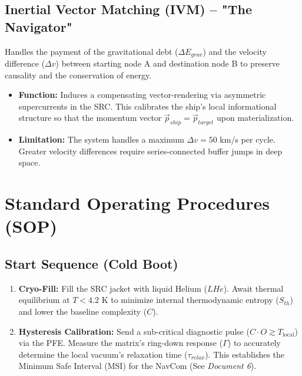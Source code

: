 \documentclass[12pt,a4paper]{article}
\begin{document}
\subsection{Inertial Vector Matching (IVM) -- "The Navigator"}
Handles the payment of the gravitational debt ($\Delta E_{grav}$) and the velocity difference ($\Delta v$) between starting node A and destination node B to preserve causality and the conservation of energy.
\begin{itemize}
    \item \textbf{Function:} Induces a compensating vector-rendering via asymmetric supercurrents in the SRC. This calibrates the ship's local informational structure so that the momentum vector $\vec{p}_{ship} = \vec{p}_{target}$ upon materialization.
    \item \textbf{Limitation:} The system handles a maximum $\Delta v = 50$ km/s per cycle. Greater velocity differences require series-connected buffer jumps in deep space.
\end{itemize}

\section{Standard Operating Procedures (SOP)}

\subsection{Start Sequence (Cold Boot)}
\begin{enumerate}
    \item \textbf{Cryo-Fill:} Fill the SRC jacket with liquid Helium ($LHe$). Await thermal equilibrium at $T < 4.2$ K to minimize internal thermodynamic entropy ($S_{th}$) and lower the baseline complexity ($C$).
    \item \textbf{Hysteresis Calibration:} Send a sub-critical diagnostic pulse ($C \cdot O \gtrsim T_{\mathrm{local}}$) via the PFE. Measure the matrix's ring-down response ($\Gamma$) to accurately determine the local vacuum's relaxation time ($\tau_{relax}$). This establishes the Minimum Safe Interval (MSI) for the NavCom (See \textit{Document 6}).
\end{enumerate}
\end{document}
